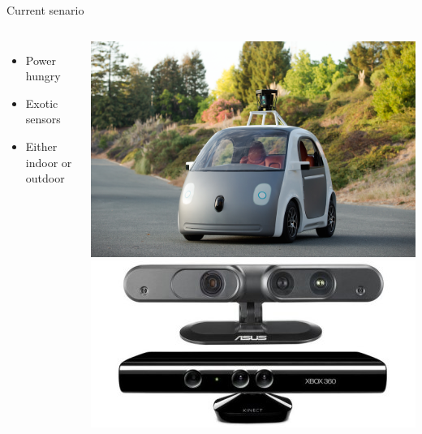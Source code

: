 \documentclass[17pt,mathserif]{beamer}
\begin{document}
    \begin{frame}{Current senario} %
      \vspace*{-3em}        
      \begin{columns}[c] %
          \begin{itemize}
            \item Power hungry
            \item Exotic sensors
            \item Either indoor or outdoor
          \end{itemize}
        \hspace*{-3em}
        \includegraphics[width=1.5\textwidth]{Google_Self-Driving_Prototype__1_}\\[1em]
        \hspace*{-2em}
        \includegraphics[width=1.2\textwidth]{kin}
      \end{columns}
    \end{frame}
        
\end{document}
